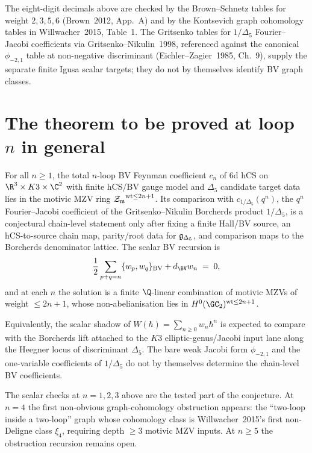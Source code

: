 The eight-digit decimals above are checked by the Brown--Schnetz tables
for weight $2, 3, 5, 6$ (Brown~2012, App.~A) and by the Kontsevich graph
cohomology tables in Willwacher~2015, Table~1. The Gritsenko tables for
$1/\Delta_5$ Fourier--Jacobi coefficients via Gritsenko--Nikulin~1998,
referenced against the canonical $\phi_{-2,1}$ table at non-negative
discriminant (Eichler--Zagier~1985, Ch.~9), supply the separate finite
Igusa scalar targets; they do not by themselves identify BV graph
classes.

\section{The theorem to be proved at loop $n$ in general}
\label{sec:general-n-loop}

\begin{conjecture}
\label{conj:all-loop-bv-anomaly}
For all $n\geq 1$, the total $n$-loop BV Feynman coefficient
$c_n$ of 6d hCS on $\R^3\times K3\times\C^2$ with finite hCS/BV gauge
model and $\Delta_5$ candidate target data lies in the motivic MZV ring
${\mathcal{Z}_{\mathfrak m}}^{\mathrm{wt}\leq 2n+1}$. Its comparison with
$c_{1/\Delta_5}(q^n)$, the $q^{n}$ Fourier--Jacobi coefficient of the
Gritsenko--Nikulin Borcherds product $1/\Delta_5$, is a conjectural
chain-level statement only after fixing a finite Hall/BV source,
an hCS-to-source chain map, parity/root data for $\mathfrak{g}_{\Delta_5}$,
and comparison maps to the Borcherds denominator lattice. The scalar
BV recursion is
\[
\frac{1}{2}\sum_{p+q = n} \{w_p, w_q\}_{\mathrm{BV}}
+ d_{\BV} w_n \;=\; 0,
\]
and at each $n$ the solution is a finite $\Q$-linear combination of
motivic MZVs of weight $\leq 2n+1$, whose non-abelianisation lies in
$H^0(\GC_2)^{\mathrm{wt}\leq 2n+1}$.

Equivalently, the scalar shadow of
$W(\hbar) = \sum_{n\geq 0} w_n \hbar^n$ is expected to compare with the
Borcherds lift attached to the $K3$ elliptic-genus/Jacobi input lane
along the Heegner locus of discriminant $\Delta_5$. The bare weak
Jacobi form $\phi_{-2,1}$ and the one-variable coefficients of
$1/\Delta_5$ do not by themselves determine the chain-level BV
coefficients.
\end{conjecture}

The scalar checks at $n = 1, 2, 3$ above are the tested part of the
conjecture. At $n = 4$ the first non-obvious graph-cohomology
obstruction appears: the
``two-loop inside a two-loop'' graph whose cohomology class
is Willwacher~2015's
first non-Deligne class $\xi_4$, requiring depth $\geq 3$ motivic
MZV inputs. At $n \geq 5$ the obstruction recursion remains open.

